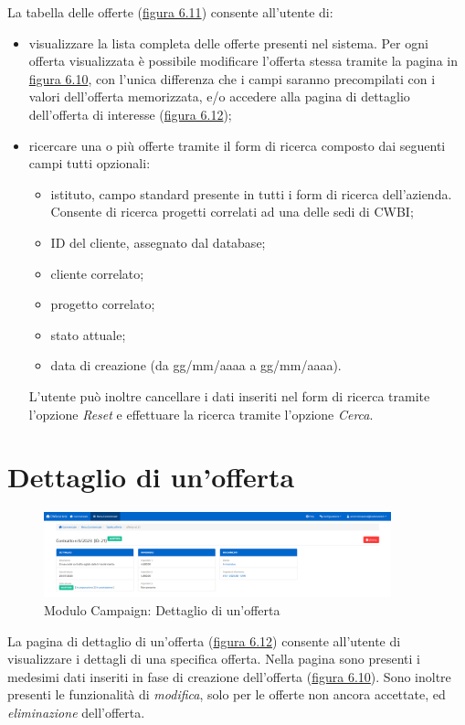 \noindent La tabella delle offerte ({\hyperref[fig:tabellaOfferte]{figura 6.11}}) consente all'utente di:
\begin{itemize}
\item visualizzare la lista completa delle offerte presenti nel sistema. Per ogni offerta visualizzata è possibile modificare l'offerta stessa tramite la pagina in {\hyperref[fig:nuovaOfferta]{figura 6.10}}, con l'unica differenza che i campi saranno precompilati con i valori dell'offerta memorizzata, e/o accedere alla  pagina di dettaglio dell'offerta di interesse ({\hyperref[fig:dettaglioOfferta]{figura 6.12}}); 
\item ricercare una o più offerte tramite il form di ricerca composto dai seguenti campi tutti opzionali:
\begin{itemize}
\item istituto, campo standard presente in tutti i form di ricerca dell'azienda. Consente di ricerca progetti correlati ad una delle sedi di CWBI;
\item ID del cliente, assegnato dal database;
\item cliente correlato;
\item progetto correlato;
\item stato attuale;
\item data di creazione (da gg/mm/aaaa a gg/mm/aaaa).
\end{itemize}
L'utente può inoltre cancellare i dati inseriti nel form di ricerca tramite l'opzione \textit{Reset} e effettuare la ricerca tramite l'opzione \textit{Cerca}.
\end{itemize}

\pagebreak

\section{Dettaglio di un'offerta}
\begin{figure}[!h]
\centering
\includegraphics[width=380px]{../images/UI/12-dettaglioOfferta.png}
\caption{Modulo Campaign: Dettaglio di un'offerta}
\label{fig:dettaglioOfferta}
\end{figure}

\noindent La pagina di dettaglio di un'offerta ({\hyperref[fig:dettaglioOfferta]{figura 6.12}}) consente all'utente di visualizzare i dettagli di una specifica offerta. Nella pagina sono presenti i medesimi dati inseriti in fase di creazione dell'offerta ({\hyperref[fig:nuovaOfferta]{figura 6.10}}). Sono inoltre presenti le funzionalità di \textit{modifica}, solo per le offerte non ancora accettate, ed \textit{eliminazione} dell'offerta.
